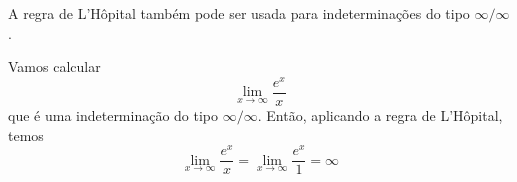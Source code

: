\cleardoublepage\documentclass[../main.tex]{subfiles}
\begin{document}
\begin{obs}
  A regra de L'Hôpital também pode ser usada para indeterminações do tipo $\infty/\infty$.
\end{obs}

\begin{ex}
  Vamos calcular
  \begin{equation*}
    \lim_{x\to \infty} \frac{e^x}{x}
  \end{equation*}
  que é uma indeterminação do tipo $\infty/\infty$. Então, aplicando a regra de L'Hôpital, temos
  \begin{equation*}
    \lim_{x\to \infty} \frac{e^x}{x} = \lim_{x\to \infty} \frac{e^x}{1} = \infty
  \end{equation*}
\end{ex}

\end{document}
